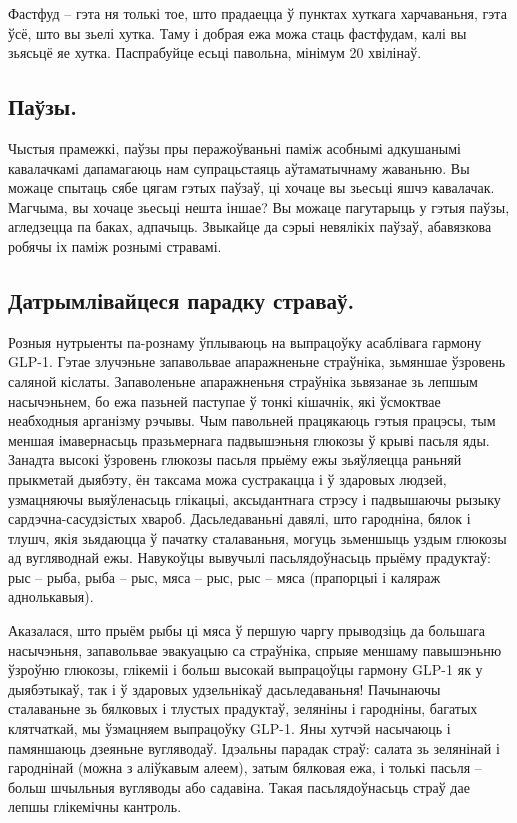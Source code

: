 Фастфуд – гэта ня толькі тое, што прадаецца ў пунктах хуткага харчаваньня, гэта ўсё, што вы зьелі хутка. Таму і добрая ежа можа стаць фастфудам, калі вы зьясьцё яе хутка. Паспрабуйце есьці павольна, мінімум 20 хвілінаў.

\subsection{Паўзы.}
Чыстыя прамежкі, паўзы пры перажоўваньні паміж асобнымі адкушанымі кавалачкамі дапамагаюць нам супрацьстаяць аўтаматычнаму жаваньню. Вы можаце спытаць сябе цягам гэтых паўзаў, ці хочаце вы зьесьці яшчэ кавалачак. Магчыма, вы хочаце зьесьці нешта іншае? Вы можаце пагутарыць у гэтыя паўзы, агледзецца па баках, адпачыць. Звыкайце да сэрыі невялікіх паўзаў, абавязкова робячы іх паміж рознымі стравамі.

\subsection{Датрымлівайцеся парадку страваў.}
Розныя нутрыенты па-рознаму ўплываюць на выпрацоўку асаблівага гармону GLP-1. Гэтае злучэньне запавольвае апаражненьне страўніка, зьмяншае ўзровень саляной кіслаты. Запаволеньне апаражненьня страўніка зьвязанае зь лепшым насычэньнем, бо ежа пазьней паступае ў тонкі кішачнік, які ўсмоктвае неабходныя арганізму рэчывы. Чым павольней працякаюць гэтыя працэсы, тым меншая імавернасьць празьмернага падвышэньня глюкозы ў крыві пасьля яды. Занадта высокі ўзровень глюкозы пасьля прыёму ежы зьяўляецца раньняй прыкметай дыябэту, ён таксама можа сустракацца і ў здаровых людзей, узмацняючы выяўленасьць глікацыі, аксыдантнага стрэсу і падвышаючы рызыку сардэчна-сасудзістых хвароб. Дасьледаваньні давялі, што гародніна, бялок і тлушч, якія зьядаюцца ў пачатку сталаваньня, могуць зьменшыць уздым глюкозы ад вугляводнай ежы. Навукоўцы вывучылі пасьлядоўнасьць прыёму прадуктаў: рыс – рыба, рыба – рыс, мяса – рыс, рыс – мяса (прапорцыі і каляраж аднолькавыя).

Аказалася, што прыём рыбы ці мяса ў першую чаргу прыводзіць да большага насычэньня, запавольвае эвакуацыю са страўніка, спрыяе меншаму павышэньню ўзроўню глюкозы, глікеміі і больш высокай выпрацоўцы гармону GLP-1 як у дыябэтыкаў, так і ў здаровых удзельнікаў дасьледаваньня! Пачынаючы сталаваньне зь бялковых і тлустых прадуктаў, зеляніны і гародніны, багатых клятчаткай, мы ўзмацняем выпрацоўку GLP-1. Яны хутчэй насычаюць і памяншаюць дзеяньне вугляводаў. Ідэальны парадак страў: салата зь зелянінай і гароднінай (можна з аліўкавым алеем), затым бялковая ежа, і толькі пасьля – больш шчыльныя вугляводы або садавіна. Такая пасьлядоўнасьць страў дае лепшы глікемічны кантроль.

